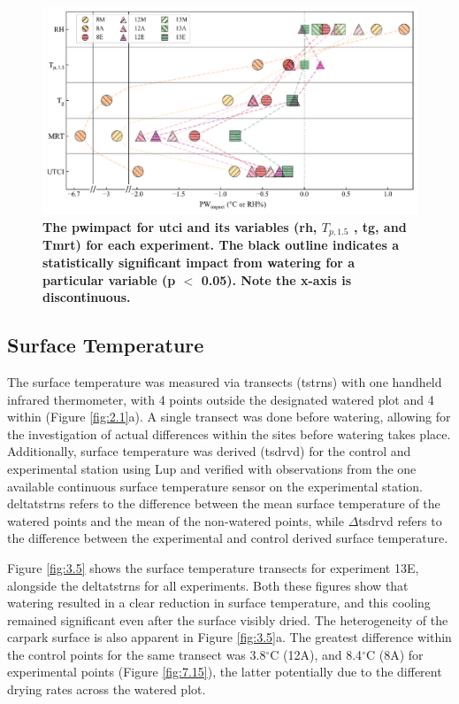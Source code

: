\documentclass[final,3p,times,authoryear]{elsarticle}
\begin{document}
\begin{figure}
\centering
\includegraphics[trim={0 0 0 0},clip,scale=1.2]{pict015.png}
\caption{\bf The \gls{pwimpact} for \gls{utci} and its variables (\gls{rh}, $T_{p,1.5}$ , \gls{tg}, and \gls{Tmrt}) for each experiment. The black outline indicates a statistically significant impact from watering for a particular variable (\gls{p} $<$ 0.05). Note the x-axis is discontinuous.}
 \label{fig:3.4}
\end{figure}


\subsection{Surface Temperature}\label{sec:discussion3.3}

The surface temperature was measured via transects (\gls{tstrns}) with one handheld infrared thermometer, with 4 points outside the designated watered plot and 4 within (Figure \ref{fig:2.1}a). A single transect was done before watering, allowing for the investigation of actual differences within the sites before watering takes place. Additionally, surface temperature was derived (\gls{tsdrvd}) for the control and experimental station using \gls{Lup} and verified with observations from the one available continuous surface temperature sensor on the experimental station. \gls{deltatstrns} refers to the difference between the mean surface temperature of the watered points and the mean of the non-watered points, while $\Delta$\gls{tsdrvd} refers to the difference between the experimental and control derived surface temperature.

Figure \ref{fig:3.5} shows the surface temperature transects for experiment 13E, alongside the \gls{deltatstrns} for all experiments. Both these figures show that watering resulted in a clear reduction in surface temperature, and this cooling remained significant even after the surface visibly dried. The heterogeneity of the carpark surface is also apparent in Figure \ref{fig:3.5}a. The greatest difference within the control points for the same transect was 3.8$^{\circ}$C (12A), and 8.4$^{\circ}$C (8A) for experimental points (Figure \ref{fig:7.15}), the latter potentially due to the different drying rates across the watered plot.
\end{document}
